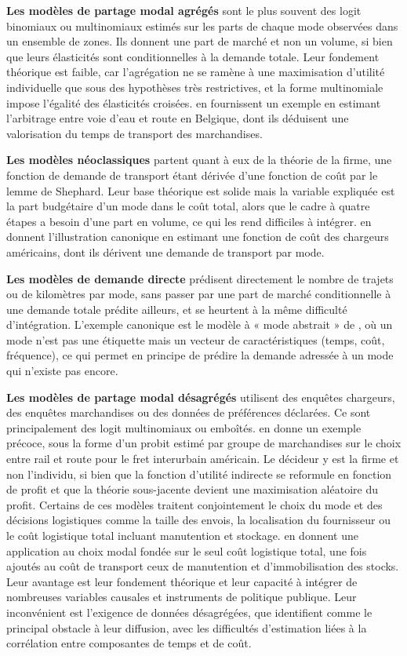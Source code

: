 \documentclass[12pt,a4paper,french]{report}
\begin{document}
	\textbf{Les modèles de partage modal agrégés} sont le plus souvent des logit binomiaux ou multinomiaux estimés sur les parts de chaque mode observées dans un ensemble de zones. Ils donnent une part de marché et non un volume, si bien que leurs élasticités sont conditionnelles à la demande totale. Leur fondement théorique est faible, car l'agrégation ne se ramène à une maximisation d'utilité individuelle que sous des hypothèses très restrictives, et la forme multinomiale impose l'égalité des élasticités croisées. \cite{BlauwensVandeVoorde1988} en fournissent un exemple en estimant l'arbitrage entre voie d'eau et route en Belgique, dont ils déduisent une valorisation du temps de transport des marchandises. 
	
	\textbf{Les modèles néoclassiques} partent quant à eux de la théorie de la firme, une fonction de demande de transport étant dérivée d'une fonction de coût par le lemme de Shephard. Leur base théorique est solide mais la variable expliquée est la part budgétaire d'un mode dans le coût total, alors que le cadre à quatre étapes a besoin d'une part en volume, ce qui les rend difficiles à intégrer. \cite{FriedlaenderSpady1980} en donnent l'illustration canonique en estimant une fonction de coût des chargeurs américains, dont ils dérivent une demande de transport par mode. 
	
	\textbf{Les modèles de demande directe} prédisent directement le nombre de trajets ou de kilomètres par mode, sans passer par une part de marché conditionnelle à une demande totale prédite ailleurs, et se heurtent à la même difficulté d'intégration. L'exemple canonique est le modèle à « mode abstrait » de \cite{QuandtBaumol1966}, où un mode n'est pas une étiquette mais un vecteur de caractéristiques (temps, coût, fréquence), ce qui permet en principe de prédire la demande adressée à un mode qui n'existe pas encore.


	\textbf{Les modèles de partage modal désagrégés} utilisent des enquêtes chargeurs, des enquêtes marchandises ou des données de préférences déclarées. Ce sont principalement des logit multinomiaux ou emboîtés. \cite{Winston1981} en donne un exemple précoce, sous la forme d'un probit estimé par groupe de marchandises sur le choix entre rail et route pour le fret interurbain américain. Le décideur y est la firme et non l'individu, si bien que la fonction d'utilité indirecte se reformule en fonction de profit et que la théorie sous-jacente devient une maximisation aléatoire du profit. Certains de ces modèles traitent conjointement le choix du mode et des décisions logistiques comme la taille des envois, la localisation du fournisseur ou le coût logistique total incluant manutention et stockage. \cite{Blauwens2001} en donnent une application au choix modal fondée sur le seul coût logistique total, une fois ajoutés au coût de transport ceux de manutention et d'immobilisation des stocks. Leur avantage est leur fondement théorique et leur capacité à intégrer de nombreuses variables causales et instruments de politique publique. Leur inconvénient est l'exigence de données désagrégées, que \cite{deJong2004} identifient comme le principal obstacle à leur diffusion, avec les difficultés d'estimation liées à la corrélation entre composantes de temps et de coût. 
	
\end{document}
